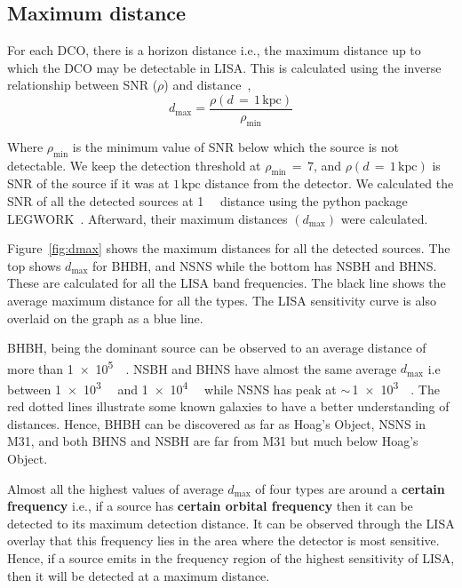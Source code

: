 \documentclass[journal, twocolumn]{IEEEtran}
\newcommand{\kpc}{\kilo\parsec}
\begin{document}
    \subsection{Maximum distance}\label{subsec:maximum-distance}
    For each DCO, there is a horizon distance i.e., the maximum distance up to which the DCO may be detectable in
    LISA. This is calculated using the inverse relationship between SNR ($\rho$) and distance~\cite{Lau2020},
    \begin{equation}
        \label{eq:eq1}
        d_\text{max}=\frac{\rho(d\,=\,1\,\text{kpc})}{\rho_\text{min}}
    \end{equation}

    Where $\rho_{\min}$ is the minimum value of SNR below which the source is not detectable.
    We keep the detection threshold at $\rho_{\min}\,=\,7$, and $\rho(d\,=\,1\,\text{kpc})$ is SNR of the source if it was at $1\,\text{kpc}$ distance from the detector.
    We calculated the SNR of all the detected sources at \SI{1}{\kpc} distance using the python package LEGWORK~\cite{wagg2021legwork}.
    Afterward, their maximum distances $(d_{\max})$ were calculated.

    Figure~\ref{fig:dmax} shows the maximum distances for all the detected sources.
    The top shows $d_{\max}$ for BHBH, and NSNS while the bottom has NSBH and BHNS\@.
    These are calculated for all the LISA band frequencies.
    The black line shows the average maximum distance for all the types.
    The LISA sensitivity curve is also overlaid on the graph as a blue line.

    BHBH, being the dominant source can be observed to an average distance of more than \SI{1e5}{\kpc}.
    NSBH and BHNS have almost the same average $d_{\max}$ i.e between \SI{1e3}{\kpc} and \SI{1e4}{\kpc} while NSNS has peak at $\sim\,$\SI{1e3}{\kpc}.
    The red dotted lines illustrate some known galaxies to have a better understanding of distances.
    Hence, BHBH can be discovered as far as Hoag's Object, NSNS in M31, and both BHNS and NSBH are far from M31 but much below Hoag's Object.


    Almost all the highest values of average $d_{\max}$ of four types are around a \textbf{certain frequency} i.e., if a source has \textbf{certain orbital frequency} then it can be detected to its maximum detection distance.
    It can be observed through the LISA overlay that this frequency lies in the area where the detector is most sensitive.
    Hence, if a source emits in the frequency region of the highest sensitivity of LISA, then it will be detected at a maximum distance.
\end{document}
